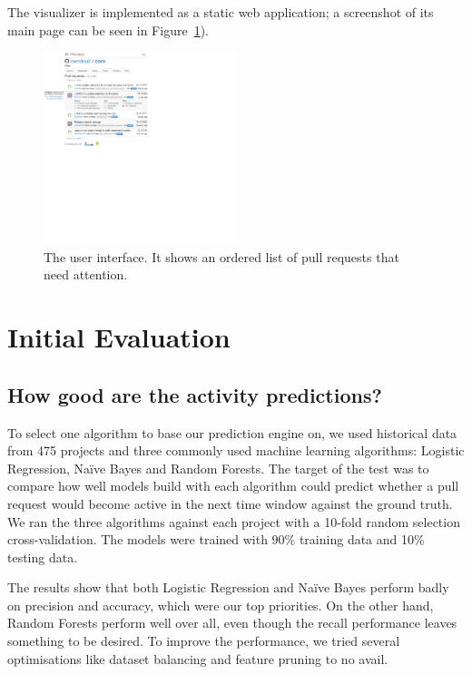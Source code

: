 \documentclass[conference]{IEEEtran}
\begin{document}
The visualizer is implemented as a static web application; a
screenshot of its main page can be seen in Figure~\ref{fig:ui}).

\begin{figure}
  \centering
  \includegraphics[width=0.5\textwidth]{../figs/interface.pdf}
  \caption[The user interface]
  {The user interface. It shows an ordered list of pull requests that need attention.}
  \label{fig:ui}
\end{figure}

\section{Initial Evaluation}
\label{sec:evaluation}

\subsection{How good are the activity predictions?}
\label{sec:learning}

To select one algorithm to base our prediction engine on, we used historical
data from 475 projects and three commonly used machine learning algorithms:
Logistic Regression, Na\"ive Bayes and Random Forests. The target of the test
was to compare how well models build with each algorithm could predict whether a
pull request would become active in the next time window against the ground
truth.  We ran the three algorithms against each project with a 10-fold random
selection cross-validation. The models were trained with 90\% training data and
10\% testing data.

The results show that both Logistic Regression and Na\"ive Bayes perform badly
on precision and accuracy, which were our top priorities.  On the other hand,
Random Forests perform well over all, even though the recall performance leaves
something to be desired. To improve the performance, we tried several
optimisations like dataset balancing and feature pruning to no avail.
\end{document}
